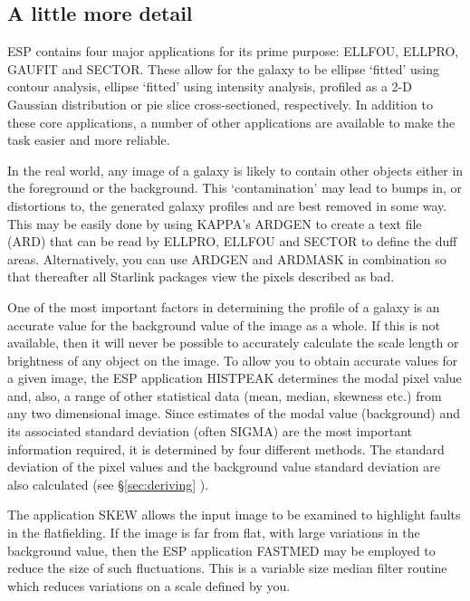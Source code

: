 \documentclass[twoside,11pt]{article}
\newcommand{\xref}[3]{#1}
\newcommand{\xlabel}[1]{}
\begin{document}
\subsection{A little more detail}
\xlabel{ALITTLEMOREDETAIL}

ESP contains four major applications for its prime purpose: ELLFOU,
ELLPRO, GAUFIT and SECTOR. These allow for the galaxy to be ellipse `fitted'
using contour analysis, ellipse `fitted' using intensity analysis,
profiled as a 2-D Gaussian distribution or pie slice cross-sectioned,
respectively. In addition to these core
applications, a number of other applications are available to make the
task easier and more reliable.

In the real world, any image of a galaxy is likely to contain other
objects either in the foreground or the background. This `contamination'
may lead to bumps in, or distortions to, the generated galaxy profiles and
are best removed in some way. This may be easily done by
using \xref{KAPPA}{sun95}{}'s ARDGEN to create a text file (ARD) that can be read by
ELLPRO, ELLFOU and SECTOR to define the duff areas. Alternatively, you can
use ARDGEN and ARDMASK in combination so that thereafter all Starlink
packages view the pixels described as bad.

One of the most important factors in determining the profile of a
galaxy is an accurate value for the background value of the image as a
whole.  If this is not available, then it will never be possible to
accurately calculate the scale length or brightness of any object on
the image.  To allow you to obtain accurate values for a given image,
the ESP application HISTPEAK determines the modal pixel value and,
also, a range of other statistical data (mean, median, skewness etc.)
from any two dimensional image. Since estimates of the modal value
(background) and its associated standard deviation (often SIGMA) are the most
important information required, it is determined by four different
methods. The standard deviation of the pixel values and the background
value standard deviation are also calculated (see \S\ref{sec:deriving} ).

The application SKEW allows the input image to be examined to highlight
faults in the flatfielding.  If the image is far from flat, with large
variations in the background value, then the ESP application FASTMED
may be employed to reduce the size of such fluctuations. This is a
variable size median filter routine which reduces variations on a scale
defined by you.
\end{document}
